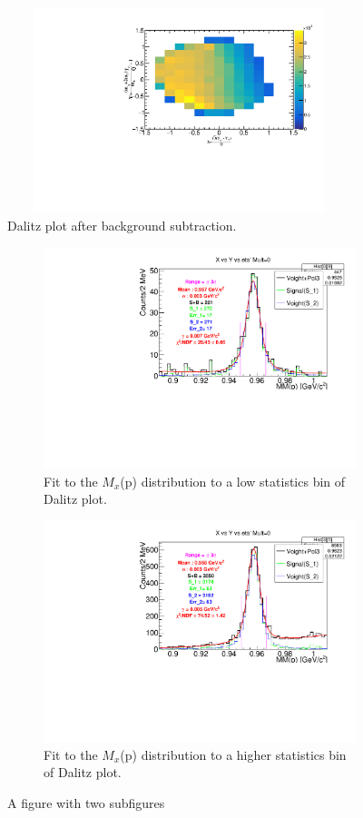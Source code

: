 \begin{figure}[ht!]
\centerline{
\includegraphics[width=10cm,height=6cm]{After_BS.pdf}}
\caption{Dalitz plot after background subtraction.}
\label{Af_DP}
\end{figure}

\begin{figure}
\centering
\begin{subfigure}{.5\textwidth}
  \centering
  \includegraphics[width=.7\linewidth]{Hist[0][8].pdf}
  \caption{Fit to the $M_{x}$(p) distribution to a low statistics bin of Dalitz plot.}
  \label{fig:sub1}
\end{subfigure}%
\begin{subfigure}{.5\textwidth}
  \centering
  \includegraphics[width=.7\linewidth]{Hist[3][5].pdf}
  \caption{Fit to the $M_{x}$(p) distribution to a higher statistics bin of Dalitz plot.}
  \label{fig:sub2}
\end{subfigure}
\caption{A figure with two subfigures}
\label{DP_fit}
\end{figure}




